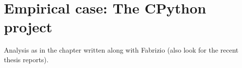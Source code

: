 
\chapter{Empirical case: The CPython project}

Analysis as in the chapter written along with Fabrizio (also look for the recent thesis reports).
